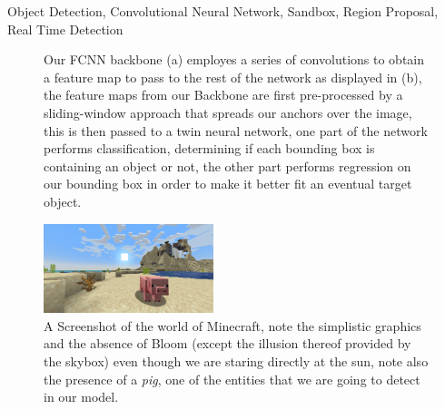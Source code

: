 \documentclass[10pt,journal,cspaper,compsoc]{IEEEtran}
\begin{document}
{%
\begin{IEEEkeywords}
 Object Detection, Convolutional Neural Network, Sandbox, Region Proposal, Real Time Detection
\end{IEEEkeywords}}

\maketitle
\IEEEpeerreviewmaketitle
    
\begin{figure}[tb]
    
    \centering
     \hfill
    \caption{Our FCNN backbone (a) employes a series of convolutions to obtain a feature map to pass to 
    the rest of the network as displayed in (b), the feature maps from our Backbone are first pre-processed
    by a sliding-window approach that spreads our anchors over the image, this is then passed to a twin neural
    network, one part of the network performs classification, determining if each bounding box is containing an
    object or not, the other part performs regression on our bounding box in order to make it better fit an eventual
    target object.}
    \label{fig:network}
\end{figure}


\begin{figure}[tb]
    \centering
    \includegraphics[width=0.44\textwidth]{images/pig.png}
    \caption{A Screenshot of the world of Minecraft, note the simplistic graphics and the absence of Bloom (except the illusion thereof provided by the 
    skybox) even though we are staring directly at the sun, note also the presence of a \emph{pig}, one of the entities that we are going to detect 
    in our model.}
    \label{fig:piggy}
\end{figure}
\end{document}
